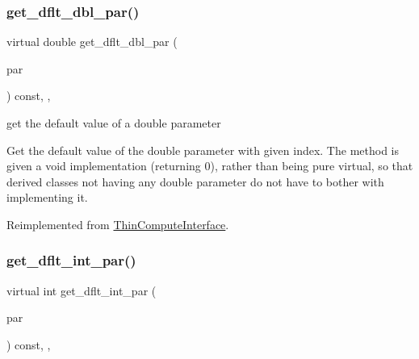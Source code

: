\subsubsection{\texorpdfstring{get\+\_\+dflt\+\_\+dbl\+\_\+par()}{get\_dflt\_dbl\_par()}}
{\footnotesize\ttfamily virtual double get\+\_\+dflt\+\_\+dbl\+\_\+par (\begin{DoxyParamCaption}\item[{const \mbox{\hyperlink{class_s_m_spp__di__unipi__it_1_1_thin_compute_interface_aa3d710629ad8c434286726ad810c3b47}{idx\+\_\+type}}}]{par }\end{DoxyParamCaption}) const\hspace{0.3cm}{\ttfamily [inline]}, {\ttfamily [override]}, {\ttfamily [virtual]}}



get the default value of a double parameter 

Get the default value of the double parameter with given index. The method is given a void implementation (returning 0), rather than being pure virtual, so that derived classes not having any double parameter do not have to bother with implementing it. 

Reimplemented from \mbox{\hyperlink{class_s_m_spp__di__unipi__it_1_1_thin_compute_interface_ae2d249f431892cbf41ccf19204b78228}{Thin\+Compute\+Interface}}.

\mbox{\label{class_s_m_spp__di__unipi__it_1_1_f_row_constraint_a75dd1491b74c4b9476755e061dce3e04}} 
\subsubsection{\texorpdfstring{get\+\_\+dflt\+\_\+int\+\_\+par()}{get\_dflt\_int\_par()}}
{\footnotesize\ttfamily virtual int get\+\_\+dflt\+\_\+int\+\_\+par (\begin{DoxyParamCaption}\item[{const \mbox{\hyperlink{class_s_m_spp__di__unipi__it_1_1_thin_compute_interface_aa3d710629ad8c434286726ad810c3b47}{idx\+\_\+type}}}]{par }\end{DoxyParamCaption}) const\hspace{0.3cm}{\ttfamily [inline]}, {\ttfamily [override]}, {\ttfamily [virtual]}}



